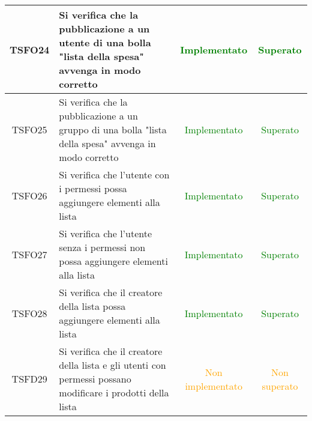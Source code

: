 \begin{center}
\begin{longtable}{|c|>{\centering}m{10cm}|c|c|}
		TSFO24 & Si verifica che la pubblicazione a un utente di una bolla "lista della spesa" avvenga in modo corretto & \textcolor{Green}{Implementato} & \textcolor{Green}{Superato} \\ \hline
		TSFO25 & Si verifica che la pubblicazione a un gruppo di una bolla "lista della spesa" avvenga in modo corretto & \textcolor{Green}{Implementato} & \textcolor{Green}{Superato} \\ \hline
		TSFO26 & Si verifica che l'utente con i permessi possa aggiungere elementi alla lista & \textcolor{Green}{Implementato} & \textcolor{Green}{Superato} \\ \hline
		TSFO27 & Si verifica che l'utente senza i permessi non possa aggiungere elementi alla lista & \textcolor{Green}{Implementato} & \textcolor{Green}{Superato} \\ \hline
		TSFO28 & Si verifica che il creatore della lista possa aggiungere elementi alla lista & \textcolor{Green}{Implementato} & \textcolor{Green}{Superato} \\ \hline
		TSFD29 & Si verifica che il creatore della lista e gli utenti con permessi possano modificare i prodotti della lista & \textcolor{Orange}{Non implementato} & \textcolor{Orange}{Non superato} \\ \hline
	\end{longtable}
\end{center}
